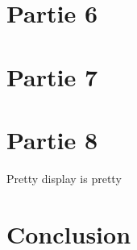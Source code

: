 \documentclass[a4paper]{article}
\begin{document}
    \section{Partie 6}
    
    \section{Partie 7}
    
    \section{Partie 8}
    Pretty display is pretty
    
    \section{Conclusion}
    
\end{document}
